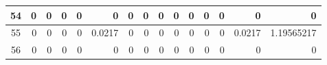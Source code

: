 \begin{table}[hb!]
\begin{adjustbox}{width = \textwidth, center}
\begin{tabular}{|c|r|r|r|r|r|r|r|r|r|r|r|r|r|r|}
        \rowcolor[HTML]{FFFFFF} 
        \cellcolor[HTML]{CFE2F3}54                                  & 0                                              & 0                                              & 0                                              & 0                                              & 0                                              & 0                                              & 0                                              & 0                                               & 0                                               & 0                                               & 0                                               & 0                                               & \cellcolor[HTML]{D9D2E9}0                                                       & \cellcolor[HTML]{D9D2E9}0                                                             \\ \hline
        \rowcolor[HTML]{FFFFFF} 
        \cellcolor[HTML]{CFE2F3}55                                  & 0                                              & 0                                              & 0                                              & 0                                              & \cellcolor[HTML]{C7E9D8}0.0217                 & 0                                              & 0                                              & 0                                               & 0                                               & 0                                               & 0                                               & 0                                               & \cellcolor[HTML]{D9D2E9}0.0217                                                  & \cellcolor[HTML]{D9D2E9}1.19565217                                                    \\ \hline
        \rowcolor[HTML]{FFFFFF} 
        \cellcolor[HTML]{CFE2F3}56                                  & 0                                              & 0                                              & 0                                              & 0                                              & 0                                              & 0                                              & 0                                              & 0                                               & 0                                               & 0                                               & 0                                               & 0                                               & \cellcolor[HTML]{D9D2E9}0                                                       & \cellcolor[HTML]{D9D2E9}0                                                             \\ \hline

\end{tabular}
\end{adjustbox}
\end{table}
